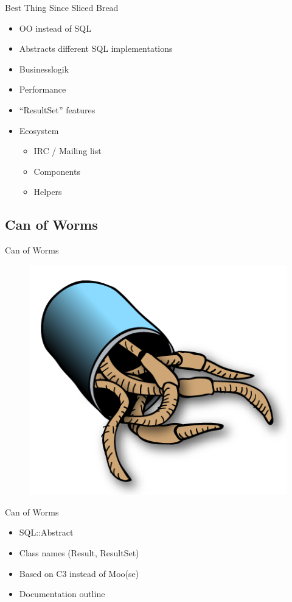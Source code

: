 \begin{frame}{Best Thing Since Sliced Bread}
\begin{itemize}
\item OO instead of SQL
\item Abstracts different SQL implementations
\item Businesslogik
\item Performance
\item ``ResultSet'' features
\item Ecosystem
\begin{itemize}
\item IRC / Mailing list
\item Components
\item Helpers
\end{itemize}
\end{itemize}
\end{frame}

\subsection{Can of Worms}

\begin{frame}{Can of Worms}
\begin{figure}[!ht]
\centering
\includegraphics[width=0.75\linewidth]{img/canofworms.png}
\end{figure}
\end{frame}

\begin{frame}{Can of Worms}
\begin{itemize}
\item SQL::Abstract
\item Class names (Result, ResultSet)
\item Based on C3 instead of Moo(se)
\item Documentation outline
\end{itemize}
\end{frame}

